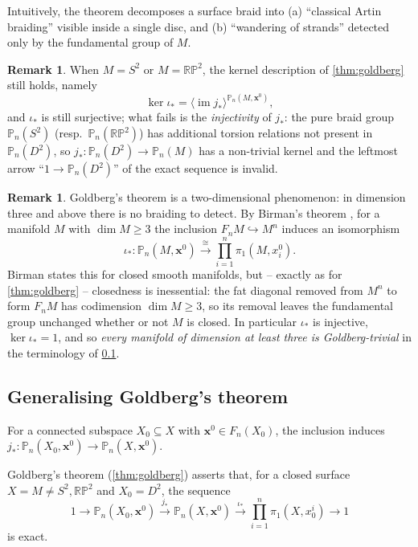 \documentclass[reqno]{amsart}
\theoremstyle{definition}
\newtheorem{remark}[theorem]{Remark}
\newcommand\bfx{\mathbf{x}}
\newcommand{\PB}{\mathbb{P}}
\newcommand{\im}{\operatorname{im}}
\newcommand{\RP}{\mathbb{RP}}
\newcommand{\co}[1]{\mathopen{\langle}#1\mathclose{\rangle}} %
\newcommand{\base}{\bfx^0}
\numberwithin{equation}{section}
\begin{document}
Intuitively, the theorem decomposes a surface braid into
(a) ``classical Artin braiding'' visible inside a single disc, and
(b) ``wandering of strands'' detected only by the fundamental group
of \(M\).

\begin{remark}\label{rem:s2-rp2}
When \(M = S^2\) or \(M = \RP^2\), the kernel description of
\cref{thm:goldberg} still holds, namely
\[
\ker\iota_\ast = \co{\im j_\ast}^{\PB_n(M,\base)},
\]
and \(\iota_\ast\) is still surjective; what fails is the
\emph{injectivity} of \(j_\ast\): the pure braid group
\(\PB_n(S^2)\) (resp.\ \(\PB_n(\RP^2)\)) has additional torsion
relations not present in \(\PB_n(D^2)\), so
\(j_\ast\colon \PB_n(D^2)\to\PB_n(M)\) has a non-trivial kernel
and the leftmost arrow ``\(1\to\PB_n(D^2)\)'' of the exact
sequence is invalid.
\end{remark}

\begin{remark}\label{rem:birman-high-dim}
Goldberg's theorem is a two-dimensional phenomenon: in dimension
three and above there is no braiding to detect. By Birman's
theorem \cite[Thm.~1]{Birman1969}, for a manifold \(M\) with
\(\dim M\geq 3\) the inclusion \(F_n M\hookrightarrow M^n\) induces
an isomorphism
\[
\iota_\ast\colon\PB_n(M,\base)\xrightarrow{\ \cong\ }
\prod_{i=1}^n\pi_1(M,x_i^0).
\]
Birman states this for closed smooth manifolds, but -- exactly
as for \cref{thm:goldberg} -- closedness is inessential:
the fat diagonal removed from \(M^n\) to form \(F_n M\) has
codimension \(\dim M\geq 3\), so its removal leaves the fundamental
group unchanged whether or not \(M\) is closed. In particular
\(\iota_\ast\) is injective, \(\ker\iota_\ast = 1\), and so
\emph{every manifold of dimension at least three is
Goldberg-trivial} in the terminology of
\cref{ssec:kernel-question}.
\end{remark}

\subsection{Generalising Goldberg's theorem}
\label{ssec:kernel-question}

For a connected subspace \(X_0\subseteq X\) with \(\base\in F_n(X_0)\),
the inclusion induces
\(j_\ast\colon\PB_n(X_0,\base)\to\PB_n(X,\base)\).

Goldberg's theorem (\cref{thm:goldberg}) asserts that, for a
closed surface \(X = M\neq S^2,\RP^2\) and \(X_0 = D^2\), the sequence
\[
1 \longrightarrow \PB_n(X_0,\base) \xrightarrow{j_\ast}
\PB_n(X,\base) \xrightarrow{\iota_\ast}
\prod_{i=1}^n \pi_1(X,x^i_0) \longrightarrow 1
\]
is exact.
\end{document}
